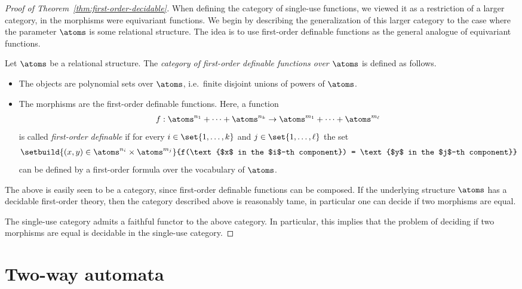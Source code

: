 \begin{proof}[Proof of Theorem~\ref{thm:first-order-decidable}]
    When defining the category of single-use functions, we viewed it as a restriction of a larger category, in the morphisms were equivariant functions.  We begin by describing the generalization of this larger category to the case where the parameter $\atoms$ is some relational structure. The idea is to use first-order definable functions as the general analogue of equivariant functions. 

\begin{definition}
    Let $\atoms$ be a relational structure. The \emph{category of first-order definable functions over $\atoms$} is defined as follows.
    \begin{itemize}
        \item The objects are polynomial sets over $\atoms$, i.e.~finite disjoint unions of powers of $\atoms$.
        \item The morphisms are the  first-order definable functions. Here, a function 
        \begin{align*}
            f : \atoms^{n_1} + \cdots + \atoms^{n_k} \to \atoms^{m_1} + \cdots + \atoms^{m_\ell}
            \end{align*}
            is called  \emph{first-order definable} if for every $i \in \set{1,\ldots,k}$ and  $j \in \set{1,\ldots,\ell}$ the set 
            \begin{align*}
            \setbuild{ (x,y) \in \atoms^{n_i} \times \atoms^{m_j}}{f(\text{$x$ in the $i$-th component}) = \text{$y$ in the $j$-th component}}
            \end{align*}
            can be defined by a first-order formula over the vocabulary of $\atoms$.
    \end{itemize}
\end{definition}
The above is easily seen to be a category, since first-order definable functions  can be composed. 
If the underlying structure $\atoms$ has a decidable first-order theory, then the category described above is reasonably tame, in particular one can decide if two morphisms are equal.

The single-use category admits a faithful functor to the above category. In particular, this implies that the problem of deciding if two morphisms are equal is decidable in the single-use category. 
\end{proof}
\section{Two-way automata}  


